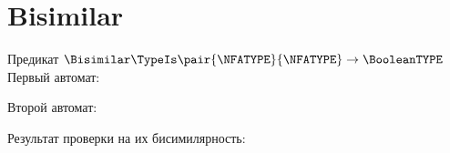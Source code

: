 \section{Bisimilar}
\begin{frame}{Предикат $\Bisimilar\TypeIs\pair{\NFATYPE}{\NFATYPE}\to\BooleanTYPE$}
	Первый автомат:


	Второй автомат:


	Результат проверки на их бисимилярность:

\end{frame}
